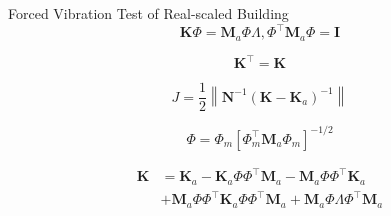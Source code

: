 \documentclass[usepdftitle=false]{beamer}
\newcommand{\matr}[1]{\mathbf{#1}}
\begin{document}
\begin{frame}{Forced Vibration Test of Real-scaled Building}
\begin{equation}\label{eq:7-4}
\matr{K}\Phi = \matr{M}_{a}\Phi\Lambda, \Phi^{\top}\matr{M}_{a}\Phi = \matr{I}
\end{equation}

\begin{equation}\label{eq:7-5}
\matr{K}^{\top} = \matr{K}
\end{equation}

\begin{equation}\label{eq:7-6}
J=\frac{1}{2}\left\| \matr{N}^{-1}\left(\matr{K}-\matr{K}_{a}\right)^{-1}\right\|
\end{equation}

\begin{equation}\label{eq:7-7}
\Phi = \Phi_{m} \left[ \Phi_{m}^{\top}\matr{M}_{a}\Phi_{m}\right]^{-1/2}
\end{equation}

\begin{equation}\label{eq:7-8}
\begin{aligned}
\matr{K}&=\matr{K}_{a} - \matr{K}_{a}\Phi\Phi^{\top}\matr{M}_{a}-\matr{M}_{a}\Phi\Phi^{\top}\matr{K}_{a}\\
&+\matr{M}_{a}\Phi\Phi^{\top}\matr{K}_{a}\Phi\Phi^{\top}\matr{M}_{a} + \matr{M}_{a}\Phi\Lambda\Phi^{\top}\matr{M}_{a}
\end{aligned}
\end{equation}
\end{frame}
\end{document}
